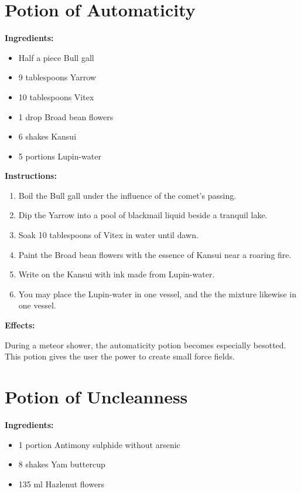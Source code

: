 \documentclass{article}
\begin{document}
\newpage
\section*{Potion of Automaticity}

\textbf{Ingredients:}

\begin{itemize}
  \item Half a piece Bull gall
  \item 9 tablespoons Yarrow
  \item 10 tablespoons Vitex
  \item 1 drop Broad bean flowers
  \item 6 shakes Kansui
  \item 5 portions Lupin-water
\end{itemize}

\textbf{Instructions:}

\begin{enumerate}
  \item Boil the Bull gall under the influence of the comet’s passing.
  \item Dip the Yarrow into a pool of blackmail liquid beside a tranquil lake.
  \item Soak 10 tablespoons of Vitex in water until dawn.
  \item Paint the Broad bean flowers with the essence of Kansui near a roaring fire.
  \item Write on the Kansui with ink made from Lupin-water.
  \item You may place the Lupin-water in one vessel, and the the mixture likewise in one vessel.
\end{enumerate}

\textbf{Effects:}

During a meteor shower, the automaticity potion becomes especially besotted. This potion gives the user the power to create small force fields.

\newpage
\section*{Potion of Uncleanness}

\textbf{Ingredients:}

\begin{itemize}
  \item 1 portion Antimony sulphide without arsenic
  \item 8 shakes Yam buttercup
  \item 135 ml Hazlenut flowers
\end{itemize}
\end{document}

